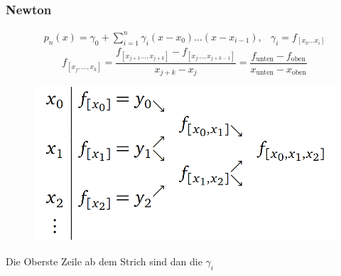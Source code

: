 \documentclass[
	ngerman,
	accentcolor=9c,%
	type=intern,
	marginpar=false
	]{tudapub}
\begin{document}
       \subsubsection{Newton}
        \begin{equation*}
            \begin{array}{cc}
                p_n(x) = \gamma_0 + \sum_{i=1}^{n} \gamma_i (x-x_0) \dots (x-x_{i-1}), & \gamma_i = f_{[x_0 \dots x_i]}    
            \end{array}
        \end{equation*}
        \begin{equation*}
            f_{[x_j,\dots,x_k]} = \dfrac{f_{[x_{j+1} \dots, x_{j+k}]} - f_{[x_{j} \dots, x_{j+k-1}]}}{x_{j+k} - x_j} = \dfrac{f_{\text{unten}} - f_{\text{oben}}}{x_{\text{unten}} - x_{\text{oben}}}
        \end{equation*}
       \begin{figure}[ht]
           \includegraphics[scale=0.3]{images/grafik.png}
           \centering
       \end{figure}
       Die Oberste Zeile ab dem Strich sind dan die $\gamma_i$
       
\end{document}
